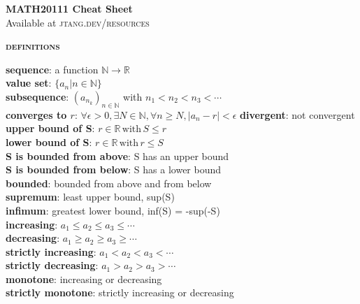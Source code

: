 \documentclass[a4paper]{article}
\begin{document}
	
\begin{center}
	\huge{\textbf{MATH20111 Cheat Sheet}}\\
	\small{Available at \textsc{jtang.dev/resources}}\\
\end{center}
\begin{multicols}{2}

\begin{framed}
	\begin{center}
		\textbf{\textsc{definitions}}
	\end{center}
	\textbf{sequence}: a function $\mathbb{N} \rightarrow \mathbb{R}$\\
	\textbf{value set}: $\{a_n \vert n \in \mathbb{N}\}$\\
	\textbf{subsequence}: $(a_{n_k})_{n\in \mathbb{N}}$ with $n_1 < n_2 < n_3 < \cdots$\\
	\textbf{converges to $r$}: $\forall \epsilon > 0, \exists N \in \mathbb{N}, \forall n \geq N, \vert a_n - r \vert < \epsilon$
	\textbf{divergent}: not convergent\\
	
	\noindent
	\textbf{upper bound of S}: $r \in \mathbb{R} \, \text{with} \, S \leq r$\\
	\textbf{lower bound of S}: $r \in \mathbb{R} \, \text{with} \, r \leq S$\\
	\textbf{S is bounded from above}: S has an upper bound\\
	\textbf{S is bounded from below}: S has a lower bound\\
	\textbf{bounded}: bounded from above and from below\\
	
	\noindent
	\textbf{supremum}: least upper bound, sup(S)\\
	\textbf{infimum}: greatest lower bound, inf(S) = -sup(-S)\\
	
	\noindent
	\textbf{increasing}: $a_1 \leq a_2 \leq a_3 \leq \cdots$\\
	\textbf{decreasing}: $a_1 \geq a_2 \geq a_3 \geq \cdots$\\
	\textbf{strictly increasing}: $a_1 < a_2 < a_3 < \cdots$\\
	\textbf{strictly decreasing}: $a_1 > a_2 > a_3 > \cdots$\\
	\textbf{monotone}: increasing or decreasing\\
	\textbf{strictly monotone}: strictly increasing or decreasing\\
	

\end{framed}
\end{multicols}
\end{document}
